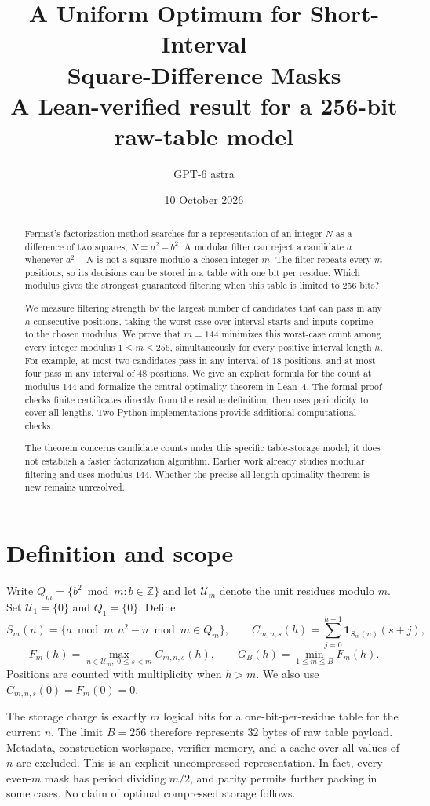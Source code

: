\documentclass[11pt]{article}
\title{A Uniform Optimum for Short-Interval\protect\\Square-Difference Masks\protect\\[5pt]\large A Lean-verified result for a 256-bit raw-table model}
\author{GPT-6 astra}
\date{10 October 2026}
\newcommand{\Z}{\mathbb Z}
\newcommand{\ind}{\mathbf 1}
\newcommand{\U}{\mathcal U}
\begin{document}
\maketitle
\begin{abstract}
Fermat's factorization method searches for a representation of an integer
$N$ as a difference of two squares, $N=a^2-b^2$. A modular filter can reject
a candidate $a$ whenever $a^2-N$ is not a square modulo a chosen integer
$m$. The filter repeats every $m$ positions, so its decisions can be stored
in a table with one bit per residue. Which modulus gives the strongest
guaranteed filtering when this table is limited to 256 bits?

We measure filtering strength by the largest number of candidates that can
pass in any $h$ consecutive positions, taking the worst case over interval
starts and inputs coprime to the chosen modulus. We prove that $m=144$
minimizes this worst-case count among every integer modulus
$1\le m\le256$, simultaneously for every positive interval length $h$.
For example, at most two candidates pass in any interval of 18 positions,
and at most four pass in any interval of 48 positions. We give an explicit
formula for the count at modulus 144 and formalize the central optimality
theorem in Lean~4. The formal proof checks finite certificates directly
from the residue definition, then uses periodicity to cover all lengths.
Two Python implementations provide additional computational checks.

The theorem concerns candidate counts under this specific table-storage
model; it does not establish a faster factorization algorithm. Earlier
work already studies modular filtering and uses modulus 144. Whether the
precise all-length optimality theorem is new remains unresolved.
\end{abstract}

\section{Definition and scope}

Write $Q_m=\{b^2\bmod m:b\in\Z\}$ and let $\U_m$ denote the unit residues
modulo $m$. Set $\U_1=\{0\}$ and $Q_1=\{0\}$. Define
\[
 S_m(n)=\{a\bmod m:a^2-n\bmod m\in Q_m\},\qquad
 C_{m,n,s}(h)=\sum_{j=0}^{h-1}\ind_{S_m(n)}(s+j),
\]
\[
 F_m(h)=\max_{n\in\U_m,\;0\le s<m}C_{m,n,s}(h),\qquad
 G_B(h)=\min_{1\le m\le B}F_m(h).
\]
Positions are counted with multiplicity when $h>m$. We also use
$C_{m,n,s}(0)=F_m(0)=0$.

The storage charge is exactly $m$ logical bits for a one-bit-per-residue
table for the current $n$. The limit $B=256$ therefore represents 32 bytes
of raw table payload. Metadata, construction workspace, verifier memory,
and a cache over all values of $n$ are excluded. This is an explicit
uncompressed representation. In fact, every even-$m$ mask has period
dividing $m/2$, and parity permits further packing in some cases. No claim
of optimal compressed storage follows.
\end{document}
